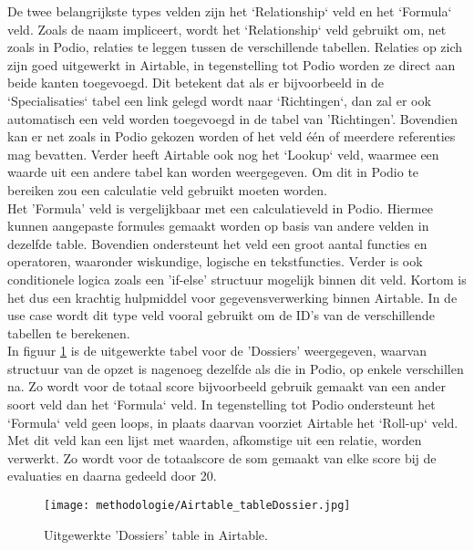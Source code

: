 De twee belangrijkste types velden zijn het `Relationship` veld en het `Formula` veld. Zoals de naam impliceert, wordt het `Relationship` veld gebruikt om, net zoals in Podio, relaties te leggen tussen de verschillende tabellen. Relaties op zich zijn goed uitgewerkt in Airtable, in tegenstelling tot Podio worden ze direct aan beide kanten toegevoegd. Dit betekent dat als er bijvoorbeeld in de `Specialisaties` tabel een link gelegd wordt naar `Richtingen`, dan zal er ook automatisch een veld worden toegevoegd in de tabel van 'Richtingen'. Bovendien kan er net zoals in Podio gekozen worden of het veld één of meerdere referenties mag bevatten. Verder heeft Airtable ook nog het `Lookup` veld, waarmee een waarde uit een andere tabel kan worden weergegeven. Om dit in Podio te bereiken zou een calculatie veld gebruikt moeten worden. \\

Het 'Formula' veld is vergelijkbaar met een calculatieveld in Podio. Hiermee kunnen aangepaste formules gemaakt worden op basis van andere velden in dezelfde table. Bovendien ondersteunt het veld een groot aantal functies en operatoren, waaronder wiskundige, logische en tekstfuncties. Verder is ook conditionele logica zoals een 'if-else' structuur mogelijk binnen dit veld. Kortom is het dus een krachtig hulpmiddel voor gegevensverwerking binnen Airtable.  In de use case wordt dit type veld vooral gebruikt om de ID's van de verschillende tabellen te berekenen. \\
 
In figuur \ref{fig:meth_airtable_dossiersTable} is de uitgewerkte tabel voor de 'Dossiers' weergegeven, waarvan structuur van de opzet is nagenoeg dezelfde als die in Podio, op enkele verschillen na. Zo wordt voor de totaal score bijvoorbeeld gebruik gemaakt van een ander soort veld dan het `Formula` veld. In tegenstelling tot Podio ondersteunt het `Formula` veld geen loops, in plaats daarvan voorziet Airtable het `Roll-up` veld. Met dit veld kan een lijst met waarden, afkomstige uit een relatie, worden verwerkt. Zo wordt voor de totaalscore de som gemaakt van elke score bij de evaluaties en daarna gedeeld door 20. \\ 

\begin{figure}[ht]
    \centering
    \texttt{[image: methodologie/Airtable\_tableDossier.jpg]}
    \caption{Uitgewerkte 'Dossiers' table in Airtable.}
    \label{fig:meth_airtable_dossiersTable}
\end{figure}


